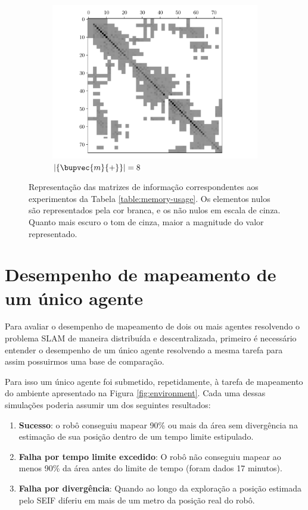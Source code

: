 \begin{figure}
\begin{subfigure}{0.49\textwidth}
    \includegraphics[width=\textwidth]{figs/seif-8-info-matrix.pdf} 
    \caption{$\lvert\{ \bupvec{m}{+} \}\rvert = 8$}
    \label{fig:seif-info-matrix-08}
  \end{subfigure}
  \caption[Matrizes de informação resultantes de diferentes valores de cardinalidade do conjunto de \textit{landmarks} ativas]{Representação das matrizes de informação correspondentes aos experimentos da Tabela \ref{table:memory-usage}. Os elementos nulos são representados pela cor branca, e os não nulos em escala de cinza. Quanto mais escuro o tom de cinza, maior a magnitude do valor representado.}
  \label{fig:seif-info-matrix-memory}
\end{figure}


\section{Desempenho de mapeamento de um único agente}
\label{sec:exp-single-robot}
Para avaliar o desempenho de mapeamento de dois ou mais agentes 
resolvendo o problema SLAM de maneira distribuída e descentralizada, 
primeiro é necessário entender o desempenho de um único agente 
resolvendo a mesma tarefa para assim possuirmos uma base de comparação.

Para isso um único agente foi submetido, repetidamente, à tarefa de mapeamento do ambiente apresentado na Figura \ref{fig:environment}. 
Cada uma dessas simulações poderia assumir um dos seguintes resultados:
\begin{enumerate}
  \item \textbf{Sucesso}: o robô conseguiu mapear 90\% ou mais da área sem 
  divergência na estimação de sua posição dentro de um tempo limite estipulado.
  \item \textbf{Falha por tempo limite excedido}: O robô não conseguiu mapear ao 
  menos 90\% da área antes do limite de tempo (foram dados 17 
  minutos).
  \item \textbf{Falha por divergência}: Quando ao longo da exploração a posição estimada pelo SEIF diferiu em mais de um metro da posição real do robô.
\end{enumerate}

